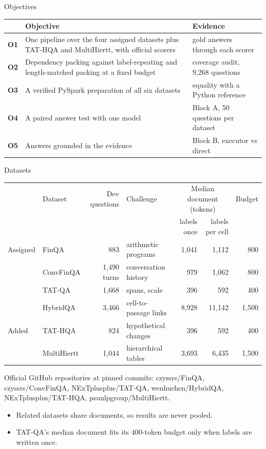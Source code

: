\documentclass[aspectratio=169,11pt]{beamer}
\newcommand{\pos}[1]{\textcolor{deporange}{\textbf{#1}}}
\begin{document}
\begin{frame}{Objectives}
\renewcommand{\arraystretch}{1.4}\small
\begin{tabular}{@{}p{}>{\raggedright\arraybackslash}p{}>{\raggedright\arraybackslash}p{}@{}}
& \textbf{Objective} & \textcolor{muted}{\textbf{Evidence}}\\\midrule
\pos{O1} & One pipeline over the four assigned datasets plus TAT-HQA and MultiHiertt, with official scorers & gold answers through each scorer\\
\pos{O2} & Dependency packing against label-repeating and length-matched packing at a fixed budget & coverage audit, 9,268 questions\\
\pos{O3} & A verified PySpark preparation of all six datasets & equality with a Python reference\\
\pos{O4} & A paired answer test with one model & Block A, 50 questions per dataset\\
\pos{O5} & Answers grounded in the evidence & Block B, executor vs direct\\
\end{tabular}
\end{frame}

\begin{frame}{Datasets}
\footnotesize\setlength{\tabcolsep}{5pt}\centering
\begin{tabular}{@{}llrlrrr@{}}
\toprule
& Dataset & Dev questions & Challenge & \multicolumn{2}{c}{Median document (tokens)} & Budget\\
& & & & labels once & labels per cell & \\\midrule
Assigned & FinQA & 883 & arithmetic programs & 1,041 & 1,112 & 800\\
& ConvFinQA & 1,490 turns & conversation history & 979 & 1,062 & 800\\
& TAT-QA & 1,668 & spans, scale & 396 & 592 & 400\\
& HybridQA & 3,466 & cell-to-passage links & 8,928 & 11,142 & 1,500\\
Added & TAT-HQA & 824 & hypothetical changes & 396 & 592 & 400\\
& MultiHiertt & 1,044 & hierarchical tables & 3,693 & 6,435 & 1,500\\\bottomrule
\end{tabular}\par\vspace{.3em}
{\scriptsize\color{muted}Official GitHub repositories at pinned commits: czyssrs/FinQA, czyssrs/ConvFinQA, NExTplusplus/TAT-QA, wenhuchen/HybridQA, NExTplusplus/TAT-HQA, psunlpgroup/MultiHiertt.}
\vspace{.6em}
\begin{itemize}\itemsep3pt\small
\item Related datasets share documents, so results are never pooled.
\item TAT-QA's median document fits its 400-token budget only when labels are written once.
\end{itemize}
\end{frame}
\end{document}
